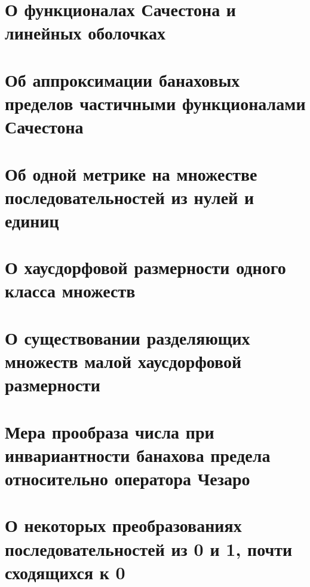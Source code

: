 \documentclass[a4paper,openbib]{report}
\theoremstyle{definition}
\newcommand\hypotlist{ }
\begin{document}
	\section{О функционалах Сачестона и линейных оболочках}
	
	

	\section{Об аппроксимации банаховых пределов частичными функционалами Сачестона}
	

	\section{Об одной метрике на множестве последовательностей из нулей и единиц}
	

	\section{О хаусдорфовой размерности одного класса множеств}
	

	\section{О существовании разделяющих множеств малой хаусдорфовой размерности}
	

	\section{Мера прообраза числа при инвариантности банахова предела относительно оператора Чезаро}
	

	\section{О некоторых преобразованиях последовательностей из 0 и 1, почти сходящихся к 0}
	


\renewcommand\label[1]{}


\printbibliography{}
\end{document}
